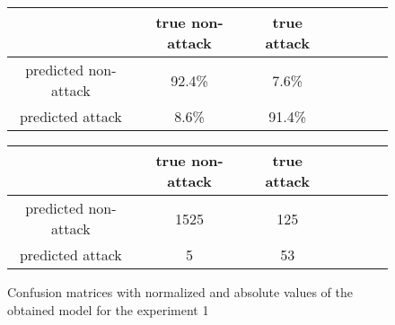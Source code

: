 \documentclass{article}
\begin{document}
\begin{figure}[h!]
    \centering
    \begin{tabular}{ |c|c|c|c|c|c|c| }
     \hline
      & true non-attack & true attack \\
     \hline
     predicted non-attack & 92.4\% & 7.6\% \\
     \hline
     predicted attack & 8.6\% & 91.4\% \\
     \hline
    \end{tabular}

    \vspace{0.2cm}

    \centering
    \begin{tabular}{ |c|c|c|c|c|c|c| }
     \hline
      & true non-attack & true attack \\
     \hline
     predicted non-attack & 1525 & 125 \\
     \hline
     predicted attack & 5 & 53 \\
     \hline
    \end{tabular}

    \caption{Confusion matrices with normalized and absolute values of the obtained model for the experiment 1}
    \label{fig-exp1-obtained-model}
\end{figure}
\end{document}
